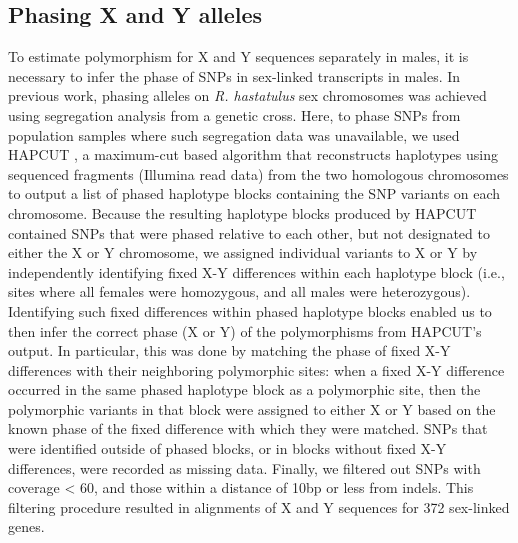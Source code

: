\documentclass[9pt,twocolumn,twoside]{gsajnl}
\begin{document}
\subsection*{Phasing X and Y alleles}
To estimate polymorphism for X and Y sequences separately in males, it is necessary to infer the phase of SNPs in sex-linked transcripts in males. In previous work, phasing alleles on \textit{R. hastatulus} sex chromosomes was achieved using segregation analysis from a genetic cross. Here, to phase SNPs from population samples where such segregation data was unavailable, we used HAPCUT \citep{bansal2008hapcut}, a maximum-cut based algorithm that reconstructs haplotypes using sequenced fragments (Illumina read data) from the two homologous chromosomes to output a list of phased haplotype blocks containing the SNP variants on each chromosome. Because the resulting haplotype blocks produced by HAPCUT contained SNPs that were phased relative to each other, but not designated to either the X or Y chromosome, we assigned individual variants to X or Y by independently identifying fixed X-Y differences within each haplotype block (i.e., sites where all females were homozygous, and all males were heterozygous). Identifying such fixed differences within phased haplotype blocks enabled us to then infer the correct phase (X or Y) of the polymorphisms from HAPCUT’s output. In particular, this was done by matching the phase of fixed X-Y differences with their neighboring polymorphic sites: when a fixed X-Y difference occurred in the same phased haplotype block as a polymorphic site, then the polymorphic variants in that block were assigned to either X or Y based on the known phase of the fixed difference with which they were matched. SNPs that were identified outside of phased blocks, or in blocks without fixed X-Y differences, were recorded as missing data. Finally, we filtered out SNPs with coverage < 60, and those within a distance of 10bp or less from indels. This filtering procedure resulted in alignments of X and Y sequences for 372 sex-linked genes.
\end{document}
